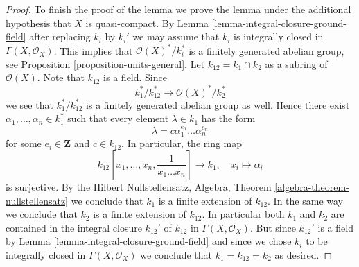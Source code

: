 \begin{proof}
\medskip\noindent
To finish the proof of the lemma we prove the lemma under the
additional hypothesis that $X$ is quasi-compact. By
Lemma \ref{lemma-integral-closure-ground-field}
after replacing $k_i$ by $k_i'$
we may assume that $k_i$ is integrally closed in $\Gamma(X, \mathcal{O}_X)$.
This implies that $\mathcal{O}(X)^*/k_i^*$ is a finitely generated
abelian group, see
Proposition \ref{proposition-units-general}.
Let $k_{12} = k_1 \cap k_2$ as a subring of $\mathcal{O}(X)$.
Note that $k_{12}$ is a field. Since
$$
k_1^*/k_{12}^* \longrightarrow \mathcal{O}(X)^*/k_2^*
$$
we see that $k_1^*/k_{12}^*$ is a finitely generated abelian group as well.
Hence there exist $\alpha_1, \ldots, \alpha_n \in k_1^*$ such that
every element $\lambda \in k_1$ has the form
$$
\lambda = c \alpha_1^{e_1} \ldots \alpha_n^{e_n}
$$
for some $e_i \in \mathbf{Z}$ and $c \in k_{12}$.
In particular, the ring map
$$
k_{12}[x_1, \ldots, x_n, \frac{1}{x_1 \ldots x_n}] \longrightarrow k_1, \quad
x_i \longmapsto \alpha_i
$$
is surjective. By the Hilbert Nullstellensatz,
Algebra, Theorem \ref{algebra-theorem-nullstellensatz}
we conclude that $k_1$ is a finite extension of $k_{12}$.
In the same way we conclude that $k_2$ is a finite extension of $k_{12}$.
In particular both $k_1$ and $k_2$ are contained in the integral closure
$k_{12}'$ of $k_{12}$ in $\Gamma(X, \mathcal{O}_X)$. But since $k_{12}'$
is a field by
Lemma \ref{lemma-integral-closure-ground-field}
and since we chose $k_i$ to be integrally closed in $\Gamma(X, \mathcal{O}_X)$
we conclude that $k_1 = k_{12} = k_2$ as desired.
\end{proof}